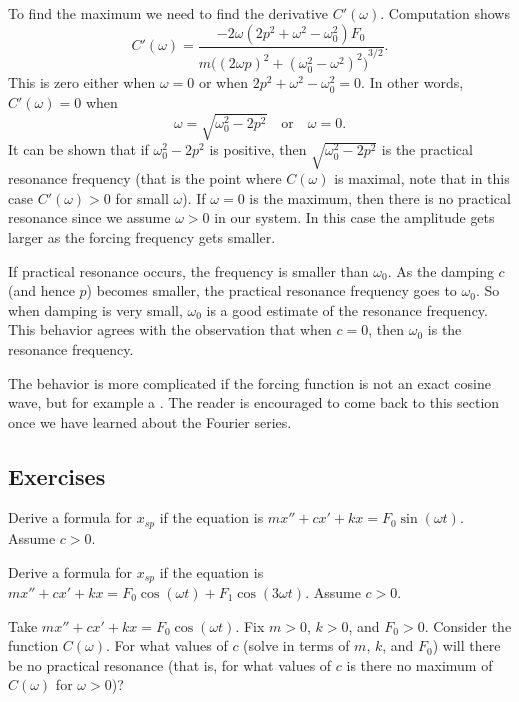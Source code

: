 \documentclass[12pt]{book}
\begin{document}
To find the maximum we need to find the derivative $C'(\omega)$.
Computation shows
\begin{equation*}
C'(\omega) =
\frac{- 2\omega( 2p^2+\omega^2-\omega_0^2)F_0}
{m {\bigl({(2\omega p)}^2+{(\omega_0^2-\omega^2)}^2\bigr)}^{3/2}} .
\end{equation*}
This is zero either when $\omega = 0$ or when
$2p^2+\omega^2-\omega_0^2 = 0$.  In other words, $C'(\omega) = 0$ when
\begin{equation*}
\boxed{
~~
\omega = \sqrt{\omega_0^2 - 2p^2} \quad \text{or} \quad \omega = 0 .
~~
}
\end{equation*}
It can be shown that if 
$\omega_0^2 - 2p^2$ is positive, then 
$\sqrt{\omega_0^2 - 2p^2}$ is the practical resonance frequency (that is the
point where $C(\omega)$ is maximal, note that in this case $C'(\omega) > 0$
for small $\omega$).  If $\omega=0$ is the maximum, then
there is no practical resonance since we assume $\omega > 0$
in our system.  In this case the amplitude gets larger as the forcing
frequency gets smaller.

If practical resonance occurs, the frequency is smaller than
$\omega_0$.  As the damping $c$ (and hence $p$) becomes smaller, the
practical resonance frequency
goes to $\omega_0$.  So when damping is very
small, $\omega_0$ is a good estimate of the resonance frequency.  This
behavior
agrees with the observation that when $c=0$, then $\omega_0$ is the resonance
frequency.

The behavior is more complicated if the forcing function is not an
exact cosine wave, but for example a .
The reader is encouraged to come
back to this section once we have learned about the Fourier series.

\subsection{Exercises}

\begin{exercise}
Derive a formula for $x_{sp}$ if the equation is
$m x'' + c x' + kx = F_0 \sin (\omega t)$.  Assume $c > 0$.
\end{exercise}

\begin{exercise}
Derive a formula for $x_{sp}$ if the equation is
$m x'' + c x' + kx = F_0 \cos (\omega t) + F_1 \cos (3\omega t)$.
Assume $c > 0$.
\end{exercise}

\begin{exercise}
Take $m x'' + c x' + kx = F_0 \cos (\omega t)$.
Fix $m > 0$, $k > 0$, and $F_0 > 0$.  Consider the function $C(\omega)$.
For what values of $c$ (solve in terms of $m$, $k$, and $F_0$) will there be no
practical resonance (that is, for what values of $c$ is there no maximum of
$C(\omega)$ for $\omega > 0$)?
\end{exercise}
\end{document}
